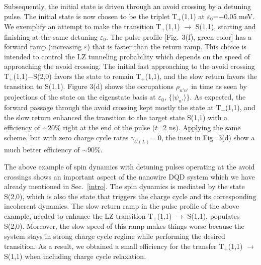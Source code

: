 \documentclass[prb,twocolumn,showpacs,floats]{revtex4}
\begin{document}
Subsequently, the initial state is driven through an avoid crossing by a detuning pulse.
The initial state is now chosen to be the triplet T$_+$(1,1) at $\varepsilon_0$=$-$0.05 meV.
We exemplify an attempt to make the transition T$_+$(1,1) $\rightarrow$ S(1,1),
starting and finishing at the same detuning $\varepsilon_0$.  
The pulse profile  [Fig.~3(f), green color] has a forward ramp 
(increasing $\varepsilon$) that is faster than the return ramp.
This choice is intended to control the LZ tunneling probability which
depends on the speed of approaching the avoid crossing. 
The initial fast approaching to the avoid crossing T$_+$(1,1)$-$S(2,0) 
favors the state to remain T$_+$(1,1), and the slow return 
favors the transition to S(1,1).
Figure 3(d) shows the occupations $\rho_{n'n'}$ in time as seen by projections of the state
on the eigenstate basis at $\varepsilon_0$, $\{ | \psi_{n'} \rangle \}$. 
As expected, the forward passage through the avoid crossing kept mostly the state at
T$_+$(1,1), and the slow return enhanced the transition to the
target state S(1,1) with a efficiency of $\sim 20\%$ right at the end of the
pulse ($t$=2 ns). Applying the same scheme, but with zero charge cycle rates $\gamma_{U(L)}$= 0, 
the inset in Fig.~3(d) show a much better efficiency of $\sim 90\%$.

The above example of spin dynamics with detuning pulses operating at the avoid crossings
shows an important aspect of the nanowire DQD system which we have already mentioned
in Sec.~\ref{intro}. The spin dynamics is mediated by the state S(2,0), which is also
the state that triggers the charge cycle and its corresponding incoherent dynamics.
The slow return ramp in the pulse profile of the above example, needed to
enhance the LZ transition T$_+$(1,1) $\rightarrow$ S(1,1), populates S(2,0).
Moreover, the slow speed of this ramp makes things worse because the system
stays in strong charge cycle regime while performing the desired transition.
As a result, we obtained a small efficiency for the transfer T$_+$(1,1) $\rightarrow$ S(1,1)
when including charge cycle relaxation.
\end{document}
